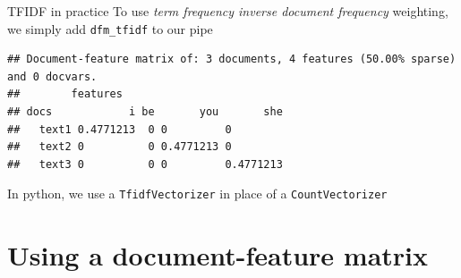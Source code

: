 \documentclass[
  10pt,
  ignorenonframetext,
  aspectratio=169]{beamer}
\newenvironment{Shaded}{\begin{snugshade}}{\end{snugshade}}
\newcommand{\AttributeTok}[1]{\textcolor[rgb]{0.80,0.80,0.80}{#1}}
\newcommand{\FunctionTok}[1]{\textcolor[rgb]{0.94,0.94,0.56}{#1}}
\newcommand{\NormalTok}[1]{\textcolor[rgb]{0.80,0.80,0.80}{#1}}
\newcommand{\OtherTok}[1]{\textcolor[rgb]{0.94,0.94,0.56}{#1}}
\newcommand{\SpecialCharTok}[1]{\textcolor[rgb]{0.86,0.64,0.64}{#1}}
\newcommand{\StringTok}[1]{\textcolor[rgb]{0.80,0.58,0.58}{#1}}
\begin{document}
\begin{frame}[fragile]{TFIDF in practice}
\protect\hypertarget{tfidf-in-practice}{}
To use \emph{term frequency inverse document frequency} weighting, we
simply add \texttt{dfm\_tfidf} to our pipe

\scriptsize

\begin{Shaded}
\end{Shaded}

\begin{verbatim}
## Document-feature matrix of: 3 documents, 4 features (50.00% sparse) and 0 docvars.
##        features
## docs            i be       you       she
##   text1 0.4771213  0 0         0        
##   text2 0          0 0.4771213 0        
##   text3 0          0 0         0.4771213
\end{verbatim}

\normalsize

In python, we use a \texttt{TfidfVectorizer} in place of a
\texttt{CountVectorizer}
\end{frame}

\hypertarget{using-a-document-feature-matrix}{%
\section{Using a document-feature
matrix}\label{using-a-document-feature-matrix}}
\end{document}
